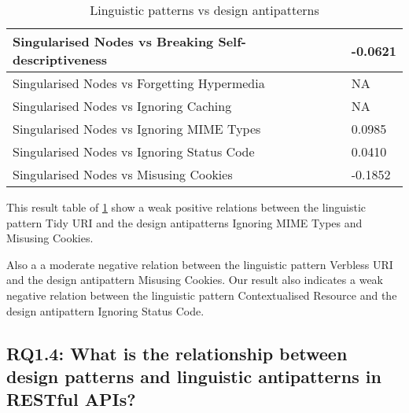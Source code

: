 \documentclass[a4paper,12pt]{article}
\begin{document}
\begin{table}[htb!]
\begin{tabular}{|p{90mm}|p{50mm}|}
\\ \hline 
Singularised Nodes vs Breaking Self-descriptiveness & -0.0621
\\ \hline 
Singularised Nodes vs Forgetting Hypermedia & NA
\\ \hline 
Singularised Nodes vs Ignoring Caching & NA
\\ \hline 
Singularised Nodes vs Ignoring MIME Types & 0.0985
\\ \hline 
Singularised Nodes vs Ignoring Status Code & 0.0410
\\ \hline 
Singularised Nodes vs Misusing Cookies & -0.1852
\\ \hline
    \end{tabular}
    \caption{Linguistic patterns vs design antipatterns}
    \label{tab:Linguistic patterns vs design antipatterns}
\end{table}

\clearpage

This result table of \ref{tab:Linguistic patterns vs design antipatterns} show a weak positive relations between the linguistic pattern Tidy URI and the design antipatterns Ignoring MIME Types and Misusing Cookies. 

Also a a moderate negative relation between the linguistic pattern Verbless URI and the design antipattern Misusing Cookies. Our result also indicates a weak negative relation between the linguistic pattern Contextualised Resource and the design antipattern Ignoring Status Code.

\subsection{\textbf{RQ1.4:} What is the relationship between design patterns and linguistic antipatterns in RESTful APIs?}
\end{document}
